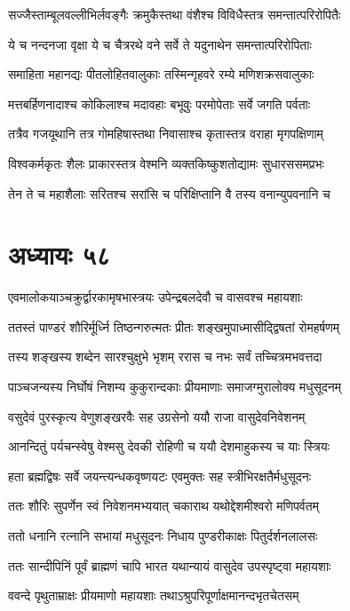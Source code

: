 \twolineshloka
{सज्जैस्ताम्बूलवल्लीभिर्लवङ्गैः क्रमुकैस्तथा}
{वंशैश्च विविधैस्तत्र समन्तात्परिरोपितैः}


\twolineshloka
{ये च नन्दनजा वृक्षा ये च चैत्ररथे वने}
{सर्वे ते यदुनाथेन समन्तात्परिरोपिताः}


\twolineshloka
{समाहिता महानद्यः पीतलोहितवालुकाः}
{तस्मिन्गृहवरे रम्ये मणिशक्रसवालुकाः}


\twolineshloka
{मत्तबर्हिणनादाश्च कोकिलाश्च मदावहाः}
{बभूवुः परमोपेताः सर्वे जगति पर्वताः}


\twolineshloka
{तत्रैव गजयूथानि तत्र गोमहिषास्तथा}
{निवासाश्च कृतास्तत्र वराहा मृगपक्षिणाम्}


\twolineshloka
{विश्वकर्मकृतः शैलः प्राकारस्तत्र वेश्मनि}
{व्यक्तकिष्कुशतोद्यामः सुधारससमप्रभः}


\twolineshloka
{तेन ते च महाशैलाः सरितश्च सरांसि च}
{परिक्षिप्तानि वै तस्य वनान्युपवनानि च}


\chapter{अध्यायः ५८}
\twolineshloka
{एवमालोकयाञ्चक्रुर्द्वारकामृषभास्त्रयः}
{उपेन्द्रबलदेवौ च वासवश्च महायशाः}


\twolineshloka
{ततस्तं पाण्डरं शौरिर्मूर्ध्नि तिष्ठन्गरुत्मतः}
{प्रीतः शङ्खमुपाध्मासीद्द्विषतां रोमहर्षणम्}


\twolineshloka
{तस्य शङ्खस्य शब्देन सारश्चुक्षुभे भृशम्}
{ररास च नभः सर्वं तच्चित्रमभवत्तदा}


\twolineshloka
{पाञ्चजन्यस्य निर्घोषं निशम्य कुकुरान्दकाः}
{प्रीयमाणाः समाजग्मुरालोक्य मधुसूदनम्}


\twolineshloka
{वसुदेवं पुरस्कृत्य वेणुशङ्खरवैः सह}
{उग्रसेनो ययौ राजा वासुदेवनिवेशनम्}


\twolineshloka
{आनन्दितुं पर्यचन्स्वेषु वेश्मसु देवकी}
{रोहिणी च ययौ देशमाहुकस्य च याः स्त्रियः}


\twolineshloka
{हता ब्रह्मद्विषः सर्वे जयन्त्यन्धकवृष्णयटः}
{एवमुक्तः सह स्त्रीभिरक्षतैर्मधुसूदनः}


\twolineshloka
{ततः शौरिः सुपर्णेन स्वं निवेशनमभ्ययात्}
{चकाराथ यथोद्देशमीश्वरो मणिपर्वतम्}


\twolineshloka
{ततो धनानि रत्नानि सभायां मधुसूदनः}
{निधाय पुण्डरीकाक्षः पितुर्दर्शनलालसः}


\twolineshloka
{ततः सान्दीपिनिं पूर्वं ब्राह्मणं चापि भारत}
{यथान्यायं वासुदेव उपस्पृष्ट्वा महायशाः}


\twolineshloka
{ववन्दे पृथुताम्राक्षः प्रीयमाणो महायशाः}
{तथाऽश्रुपरिपूर्णाक्षमानन्दभृतचेतसम्}


